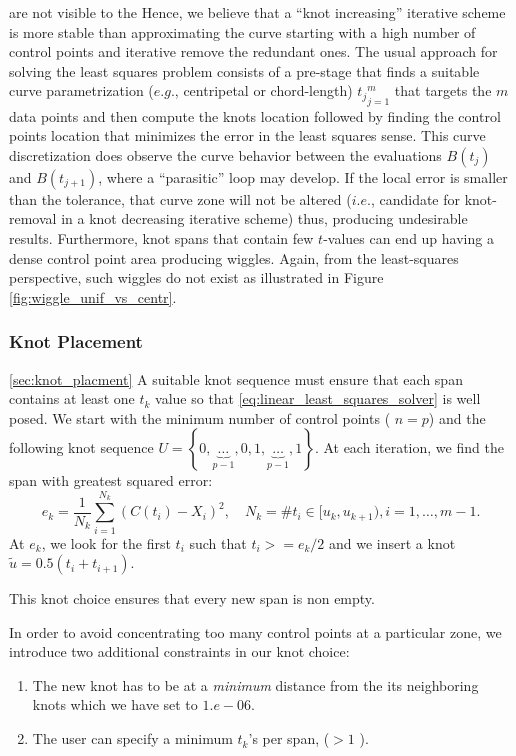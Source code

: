  are not visible to the 
Hence, we believe that 
a ``knot increasing'' iterative scheme is more stable than approximating the curve starting with a high number of control points and iterative remove the redundant ones. 
The usual approach for solving the least squares problem consists of a pre-stage that finds a suitable curve parametrization ($e.g.$, centripetal or chord-length)  ${t_j}_{j=1}^m$ that targets the $m$ data points and
then compute the knots location followed by finding the control points location that minimizes the error in the least squares sense. 
This curve discretization does observe the curve behavior between the evaluations $B(t_j)$ and $B(t_{j+1})$, where a ``parasitic'' loop may develop. If the local error is smaller than the tolerance, that 
curve zone will not be altered ($i.e.$, candidate for knot-removal in a knot decreasing iterative scheme) thus, producing undesirable results. Furthermore, knot spans that contain few $t$-values can end up having a dense control point area 
producing wiggles. Again, from the least-squares perspective, such wiggles do not exist as illustrated in Figure \ref{fig:wiggle_unif_vs_centr}.


\subsubsection{Knot Placement}\ref{sec:knot_placment}
A suitable knot sequence must ensure that each span contains at least one $t_k$ value so that \eqref{eq:linear_least_squares_solver} is well posed. 
We start with the minimum number of control points ( $n = p$) and the following knot sequence 
$U=\left\{0,\underbrace{\ldots}_{p-1},0,1,\underbrace{\ldots}_{p-1},1\right\}$. 
 At each iteration, we find the span with greatest squared error: 
 $$e_k = \frac{1}{N_k}\sum_{i=1}^{N_k} (C(t_i) - X_i)^2,\quad N_k = \# t_i\in [u_k, u_{k+1}), i=1,\ldots,m-1.$$
At $e_k$, we look for the first $t_i$ such that $t_i >= e_k/2$ and we insert a knot $\tilde u = 0.5(t_i+t_{i+1})$. 
 \begin{remark}
  This knot choice ensures that every new span is non empty. 
 \end{remark}
In order to avoid concentrating too many control points at a particular zone, we introduce two additional 
constraints in our knot choice:
\begin{enumerate}
 \item The new knot has to be at a \emph{minimum} distance from the its neighboring knots which we have set to $1.e-06$. 
 \item The user can specify a minimum $t_k$'s per span, ($>1$ ). 
\end{enumerate}

